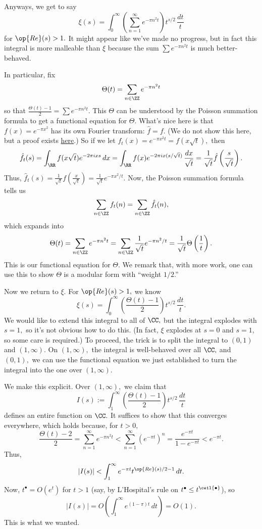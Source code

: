 Anyways, we get to say
\[\xi(s)=\int_0^\infty\left(\sum_{n=1}^\infty e^{-\pi n^2t}\right)t^{s/2}\,\frac{dt}t\]
for $\op{Re}(s)>1.$ It might appear like we've made no progress, but in fact this integral is more malleable than $\xi$ because the sum $\sum e^{-\pi n^2t}$ is much better-behaved.

In particular, fix
\[\Theta(t)=\sum_{n\in\ZZ}e^{-\pi n^2t}\]
so that $\frac{\Theta(t)-1}2=\sum e^{-\pi n^2t}.$ This $\Theta$ can be understood by the Poisson summation formula to get a functional equation for $\Theta.$ What's nice here is that $f(x)=e^{-\pi x^2}$ has its own Fourier transform: $\hat f=f.$ (We do not show this here, but a proof exists \href{https://math.stackexchange.com/questions/270566/how-to-calculate-the-fourier-transform-of-a-gaussian-function}{here}.) So if we let $f_t(x)=e^{-\pi x^2t}=f(x\sqrt t),$ then
\[\hat f_t(s)=\int_\RR f(x\sqrt t)e^{-2\pi ixs}\,dx=\int_\RR f(x)e^{-2\pi ix(s/\sqrt t)}\,\frac{dx}{\sqrt t}=\frac1{\sqrt t}\hat f\left(\frac s{\sqrt t}\right).\]
Thus, $\hat f_t(s)=\frac1{\sqrt t}f\left(\frac x{\sqrt t}\right)=\frac1{\sqrt t}e^{-\pi x^2/t}.$ Now, the Poisson summation formula tells us
\[\sum_{n\in\ZZ}f_t(n)=\sum_{n\in\ZZ}\hat f_t(n),\]
which expands into
\[\Theta(t)=\sum_{n\in\ZZ}e^{-\pi n^2t}=\sum_{n\in\ZZ}\frac1{\sqrt t}e^{-\pi n^2/t}=\frac1{\sqrt t}\Theta\left(\frac1t\right).\]
This is our functional equation for $\Theta.$ We remark that, with more work, one can use this to show $\Theta$ is a modular form with ``weight $1/2$.''

Now we return to $\xi.$ For $\op{Re}(s)>1,$ we know
\[\xi(s)=\int_0^\infty\left(\frac{\Theta(t)-1}2\right)t^{s/2}\,\frac{dt}t.\]
We would like to extend this integral to all of $\CC,$ but the integral explodes with $s=1,$ so it's not obvious how to do this. (In fact, $\xi$ explodes at $s=0$ and $s=1,$ so some care is required.) To proceed, the trick is to split the integral to $(0,1)$ and $(1,\infty).$ On $(1,\infty),$ the integral is well-behaved over all $\CC,$ and $(0,1),$ we can use the functional equation we just established to turn the integral into the one over $(1,\infty).$

We make this explicit. Over $(1,\infty),$ we claim that
\[I(s):=\int_1^\infty\left(\frac{\Theta(t)-1}2\right)t^{s/2}\,\frac{dt}t\]
defines an entire function on $\CC.$ It suffices to show that this converges everywhere, which holds because, for $t>0,$
\[\frac{\Theta(t)-2}2=\sum_{n=1}^\infty e^{-\pi n^2t}<\sum_{n=1}^\infty\left(e^{-\pi t}\right)^n=\frac{e^{-\pi t}}{1-e^{-\pi t}}<e^{-\pi t}.\]
Thus,
\[|I(s)|<\int_1^\infty e^{-\pi t}t^{\op{Re}(s)/2-1}\,dt.\]
Now, $t^\bullet=O\left(e^t\right)$ for $t>1$ (say, by L'Hospital's rule on $t^\bullet\le t^{\ceil{\bullet}}$), so
\[|I(s)|=O\left(\int_1^\infty e^{(1-\pi)t}\,dt\right)=O(1).\]
This is what we wanted.

